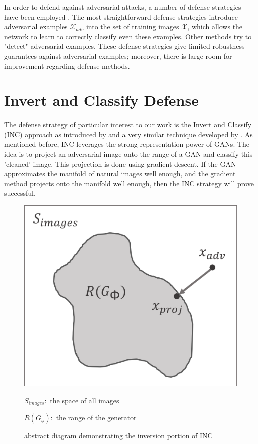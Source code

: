 \documentclass{article}
\theoremstyle{definition}
\begin{document}

In order to defend against adversarial attacks, a number of defense strategies have been employed \cite{athalye2018}.
The most straightforward defense strategies introduce adversarial examples $\mathcal{X}_{adv}$ into the set of training images
$\mathcal{X}$, which allows the network to learn to correctly classify even these examples. Other methods try to
"detect" adversarial examples. These defense strategies give limited robustness guarantees against adversarial examples; moreover, there is large room for improvement regarding defense methods.

\section{Invert and Classify Defense}
The defense strategy of particular interest to our work is the Invert and Classify (INC) approach as introduced by \cite{ilyas2017} and a very similar technique developed by \cite{pixel}. As mentioned before, INC leverages the strong representation power
of GANs. The idea is to project an adversarial image onto the range of a GAN and classify this 'cleaned' image.
This projection is done using gradient descent. If the GAN approximates the manifold of natural images well enough, and
the gradient method projects onto the manifold well enough, then the INC strategy will prove successful.

\begin{figure}[H]
    \centering
    \includegraphics[scale=0.3]{./projection_diagram.png}

    $S_{images}:$ the space of all images

    $R(G_{\phi}):$ the range of the generator
    \caption{abstract diagram demonstrating the inversion portion of INC}
    \label{fig:INC}
\end{figure}
\end{document}
